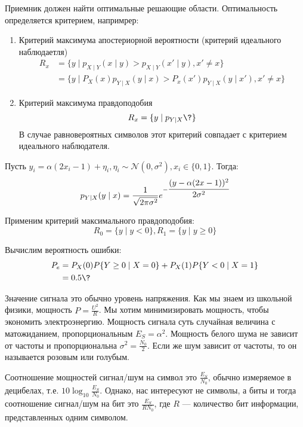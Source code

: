 Приемник должен найти оптимальные решающие области.
Оптимальность определяется критерием, напримрер:
\begin{enumerate}
    \item Критерий максимума апостериорной вероятности (критерий идеального наблюдаетля)
        \begin{align*}
            R_x
            & = \{y \mid p_{X \mid Y}(x \mid y) > p_{X \mid Y} (x' \mid y), x ' \neq x\} \\ 
            & = \{y \mid P_X(x) p_{Y \mid X}(y \mid x) > P_x(x') p_{Y \mid X} (y \mid x'), x' \neq x\}  
        \end{align*}
    \item Критерий максимума правдоподобия
        \[R_x = \{y \mid p_{Y \mid X} \?\} \] 
        В случае равновероятных символов этот критерий совпадает с критерием идеального наблюдателя.
\end{enumerate}

\begin{example}
    Пусть \(y_i = \alpha(2x_i - 1) + \eta_i, \eta_i \sim \mathcal{N}(0, \sigma^2), x_i \in \{0, 1\} \). Тогда:
    \[p_{Y \mid X}(y \mid x)
    = \frac{1}{\sqrt{2 \pi \sigma^2}} e^{- \cfrac{(y - \alpha(2x - 1))^2}{2 \sigma^2}}\] 

    Применим критерий максимального правдоподобия:
    \[R_0 = \{y \mid y < 0\}, R_1 = \{y \mid y \ge 0\} \] 

    Вычислим вероятность ошибки:
    \begin{align*}
        P_e & = P_X(0)P \{Y \ge 0 \mid X = 0\} + P_X(1) P \{Y < 0 \mid X = 1\} \\
         & = 0.5 \?
    \end{align*}
\end{example}

Значение сигнала это обычно уровень напряжения. 
Как мы знаем из школьной физики, мощность \(P = \frac{U^2}{R}\).
Мы хотим минимизировать мощность, чтобы экономить электроэнергию.
Мощность сигнала суть случайная величина с матожиданием, пропорциональным \(E_S = \alpha^2\).
Мощность белого шума не зависит от частоты и пропорциональна \(\sigma^2 = \frac{N_0}{2}\).
Если же шум зависит от частоты, то он называется розовым или голубым.

Соотношение мощностей сигнал/шум на символ это \(\frac{E_S}{N_0}\), обычно измеряемое в децибелах, т.е. \(10 \log_{10} \frac{E_S}{N_0}\).
Однако, нас интересуют не символы, а биты и тогда соотношение сигнал/шум на бит это \(\frac{E_S}{RN_0}\),
где \(R\) --- количество бит информации, представленных одним символом.

